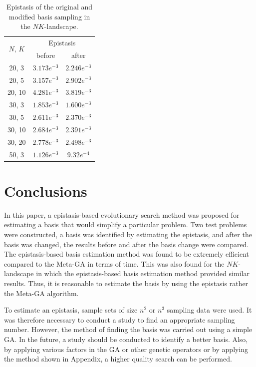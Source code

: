 \begin{table}[ht!]
	\caption{Epistasis of the original and modified basis sampling in the $NK$-landscape.} \label{tab:epi_nk}
	\vspace*{0.2cm}
	\centering
\begin{tabular}{ccc}
	\toprule
	\multirow{2}{*}{$ N,\, K $} & \multicolumn{2}{c}{Epistasis} \\	\cmidrule(lr){2-3}
	& before & after \\
	\midrule
	20, 3	& $ 3.173e^{-3} $ & $ 2.246e^{-3} $ \\
	20, 5	& $ 3.157e^{-3} $ & $ 2.902e^{-3} $ \\
	20, 10	& $ 4.281e^{-3} $ & $ 3.819e^{-3} $ \\
	30, 3	& $ 1.853e^{-3} $ & $ 1.600e^{-3} $ \\
	30, 5	& $ 2.611e^{-3} $ & $ 2.370e^{-3} $ \\
	30, 10	& $ 2.684e^{-3} $ & $ 2.391e^{-3} $ \\
	30, 20	& $ 2.778e^{-3} $ & $ 2.498e^{-3} $ \\
	50, 3	& $ 1.126e^{-3} $ & $ 9.32e^{-4}  $ \\
	\bottomrule
\end{tabular}
\end{table}


\section{Conclusions} \label{sec7:conclusions}
In this paper, a epistasis-based evolutionary search method was proposed for estimating a basis that would simplify a particular problem. Two test problems were constructed, a basis was identified by estimating the epistasis, and after the basis was changed, the results before and after the basis change were compared. The epistasis-based basis estimation method was found to be extremely efficient compared to the Meta-GA in terms of time. This was also found for the $ NK $-landscape in which the epistasis-based basis estimation method provided similar results. Thus, it is reasonable to estimate the basis by using the epistasis rather the Meta-GA algorithm.

To estimate an epistasis, sample sets of size $ n^2 $ or $ n^3 $ sampling data were used. It was therefore necessary to conduct a study to find an appropriate sampling number. However, the method of finding the basis was carried out using a simple GA. In the future, a study should be conducted to identify a better basis. Also, by applying various factors in the GA or other genetic operators or by applying the method shown in Appendix, a higher quality search can be performed.

